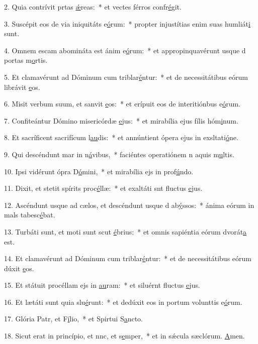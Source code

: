 2. Quia contrívit prtas \uline{ǽ}reas:~* et vectes férros confr\uline{é}git.\par 
3. Suscépit eos de via iniquitáts e\uline{ó}rum:~* propter injustítias enim suas humliát\uline{i} sunt.\par 
4. Omnem escam abomináta est ánim e\uline{ó}rum:~* et appropinquavérunt usque d portas m\uline{o}rtis.\par 
5. Et clamavérunt ad Dóminum cum triblar\uline{é}ntur:~* et de necessitátibus eórum librávit \uline{e}os.\par 
6. Misit verbum suum, et sanvit \uline{e}os:~* et erípuit eos de interitiónbus e\uline{ó}rum.\par 
7. Confiteántur Dómino misericórdæ \uline{e}jus:~* et mirabília ejus fílis hóm\uline{i}num.\par 
8. Et sacríficent sacrifícum l\uline{au}dis:~* et annúntient ópera ejus in exsltati\uline{ó}ne.\par 
9. Qui descéndunt mar in n\uline{á}vibus,~* faciéntes operatiónem n aquis m\uline{u}ltis.\par 
10. Ipsi vidérunt ópra D\uline{ó}mini,~* et mirabília ejs in prof\uline{ú}ndo.\par 
11. Dixit, et stetit spírits proc\uline{é}llæ:~* et exaltáti snt fluctus \uline{e}jus.\par 
12. Ascéndunt usque ad cælos, et descéndunt usque d ab\uline{ý}ssos:~* ánima eórum in mals tabesc\uline{é}bat.\par 
13. Turbáti sunt, et moti sunt scut \uline{é}brius:~* et omnis sapiéntia eórum dvorát\uline{a} est.\par 
14. Et clamavérunt ad Dóminum cum triblar\uline{é}ntur:~* et de necessitátibus eórum dúxit \uline{e}os.\par 
15. Et státuit procéllam ejs in \uline{au}ram:~* et siluérnt fluctus \uline{e}jus.\par 
16. Et lætáti sunt quia slu\uline{é}runt:~* et dedúxit eos in portum volunttis e\uline{ó}rum.\par 
17. Glória Patr, et F\uline{í}lio,~* et Spirtui S\uline{a}ncto.\par 
18. Sicut erat in princípio, et nnc, et s\uline{e}mper,~* et in sǽcula sæclórum. \uline{A}men.\par 
